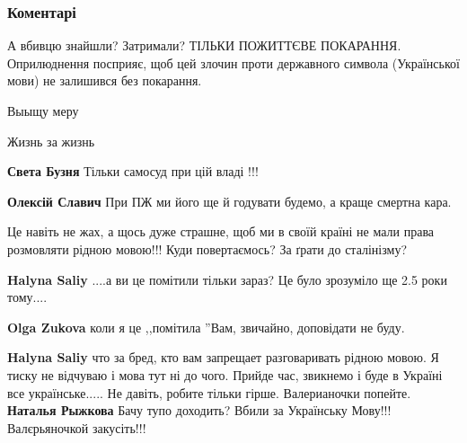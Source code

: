  
 
 
 
 
\subsubsection{Коментарі}
\label{sec:07_11_2021.fb.smolij_andrij.1.balabatjko_ubijstvo_mova.cmt}

\begin{itemize} %

А вбивцю знайшли? Затримали?
ТІЛЬКИ ПОЖИТТЄВЕ ПОКАРАННЯ.
Оприлюднення посприяє, щоб цей злочин проти державного символа (Української мови) не залишився без покарання.

\begin{itemize} %
Выыщу меру

Жизнь за жизнь

\textbf{Света Бузня} Тільки самосуд при цій владі !!!

\textbf{Олексій Славич} При ПЖ ми його ще й годувати будемо, а краще смертна кара.
\end{itemize} %


Це навіть не жах, а щось дуже страшне, щоб ми в своїй країні не мали права
розмовляти рідною мовою!!! Куди повертаємось? За ґрати до сталінізму?

\begin{itemize} %
\textbf{Halyna Saliy} ....а ви це помітили тільки зараз? Це було зрозуміло ще 2.5 роки тому....

\textbf{Olga Zukova} коли я це ,,помітила ''Вам, звичайно, доповідати не буду.

\textbf{Halyna Saliy} что за бред, кто вам запрещает разговаривать рідною мовою.
Я тиску не відчуваю і мова тут ні до чого. Прийде час, звикнемо і буде в Україні все українське..... Не давіть, робите тільки гірше.
Валерианочки попейте.
\textbf{Наталья Рыжкова} Бачу тупо доходить? Вбили за Українську Мову!!! Валєрьяночкой закусіть!!!


\end{itemize}
\end{itemize}
